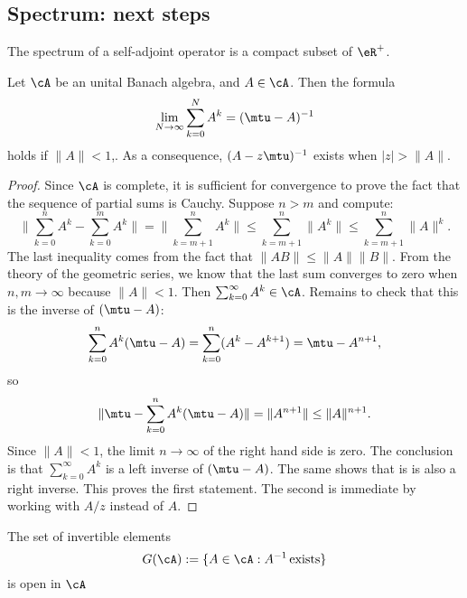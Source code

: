 \subsection{Spectrum: next steps}

\begin{lemma}
The spectrum of a self-adjoint operator is a compact subset of $\eR^+$.
\end{lemma}

\begin{lemma}\label{lem:cv_Ak}
Let $\cA$ be an unital Banach algebra, and $A\in\cA$. Then the formula
\begin{equation}
   \lim_{N\to\infty}\sum_{k=0}^{N}A^k = (\mtu-A)^{-1}
\end{equation}
holds if $\|A\|< 1$,. As a consequence, $(A-z\mtu)^{-1}$ exists when $|z|>\|A\|$.
\end{lemma}

\begin{proof}
	Since $\cA$ is complete, it is sufficient for convergence to prove the fact that the sequence of partial sums is Cauchy. Suppose $n>m$ and compute:
	\[
	  \| \sum_{k=0}^nA^k-\sum_{k=0}^mA^k  \|=\| \sum_{k=m+1}^nA^k \|\leq\sum_{k=m+1}^n\|A^k\|
	     \leq\sum_{k=m+1}^n\|A\|^k.
	\]
	The last inequality comes from the fact that $\|AB\|\leq\|A\|\|B\|$. From the theory of the geometric series, we know that the last sum converges to zero when $n,m\to\infty$ because $\|A\|<1$.
	Then
	$   \sum_{k=0}^{\infty}A^k\in\cA$.
	Remains to check that this is the inverse of $(\mtu-A)$:
	\[
	   \sum_{k=0}^nA^k(\mtu-A)=\sum_{k=0}^n(A^k-A^{k+1})=\mtu-A^{n+1},
	\]
	so
	\[
	   \|\mtu-\sum_{k=0}^nA^k(\mtu-A)   \|=\|A^{n+1}\|\leq\|A\|^{n+1}.
	\]
	Since $\|A\|< 1$, the limit $n\to\infty$ of the right hand side is zero. The conclusion is that $\sum_{k=0}^{\infty}A^k$ is a left inverse of $(\mtu-A)$. The same shows that is is also a right inverse. This proves the first statement. The second is immediate by working with $A/z$ instead of $A$.

\end{proof}

\begin{lemma}
The set of invertible elements
\[
   G(\cA):=\{A\in\cA : A^{-1}\,\text{exists}\}
\]
is open in $\cA$
\end{lemma} \label{lem:G_ouvert}


